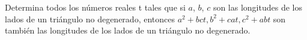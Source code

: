 Determina todos los números reales t tales que si $a$, $b$, $c$ son las longitudes de los lados
de un triángulo no degenerado, entonces $a^2 + bct, b^2 + cat, c^2 + abt$ son también las longitudes de los
lados de un triángulo no degenerado.